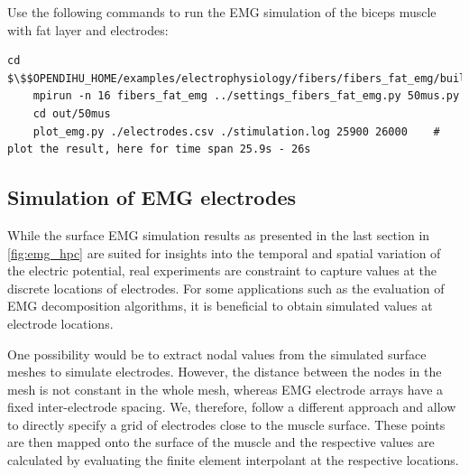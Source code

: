 %

\begin{reproduce_no_break}
  Use the following commands to run the EMG simulation of the biceps muscle with fat layer and electrodes:
  \begin{lstlisting}[columns=fullflexible,breaklines=true,postbreak=\mbox{\textcolor{gray}{$\hookrightarrow$}\space}]
    cd $\$$OPENDIHU_HOME/examples/electrophysiology/fibers/fibers_fat_emg/build_release
    mpirun -n 16 fibers_fat_emg ../settings_fibers_fat_emg.py 50mus.py
    cd out/50mus
    plot_emg.py ./electrodes.csv ./stimulation.log 25900 26000    # plot the result, here for time span 25.9s - 26s
  \end{lstlisting}
\end{reproduce_no_break}

\subsection{Simulation of EMG electrodes}\label{sec:simfiber_electrodes}

While the surface EMG simulation results as presented in the last section in \cref{fig:emg_hpc} are suited for insights into the temporal and spatial variation of the electric potential, real experiments are constraint to capture values at the discrete locations of electrodes.
For some applications such as the evaluation of EMG decomposition algorithms, it is beneficial to obtain simulated values at electrode locations.

One possibility would be to extract nodal values from the simulated surface meshes to simulate electrodes. However, the distance between the nodes in the mesh is not constant in the whole mesh, whereas EMG electrode arrays have a fixed inter-electrode spacing. We, therefore, follow a different approach and allow to directly specify a grid of electrodes close to the muscle surface. These points are then mapped onto the surface of the muscle and the respective values are calculated by evaluating the finite element interpolant at the respective locations.

